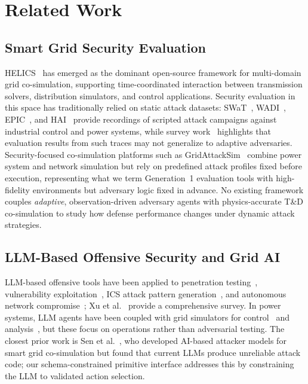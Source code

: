 \section{Related Work}
\label{sec:related}

\subsection{Smart Grid Security Evaluation}
\label{sec:related:eval}

HELICS~\cite{hardy2024helics} has emerged as the dominant open-source framework for multi-domain grid co-simulation, supporting time-coordinated interaction between transmission solvers, distribution simulators, and control applications.
Security evaluation in this space has traditionally relied on static attack datasets: SWaT~\cite{goh2017swat}, WADI~\cite{ahmed2017wadi}, EPIC~\cite{adepu2019epic}, and HAI~\cite{shin2020hai} provide recordings of scripted attack campaigns against industrial control and power systems, while survey work~\cite{sahani2023mlids} highlights that evaluation results from such traces may not generalize to adaptive adversaries.
Security-focused co-simulation platforms such as GridAttackSim~\cite{le2020gridattacksim} combine power system and network simulation but rely on predefined attack profiles fixed before execution, representing what we term Generation~1 evaluation tools with high-fidelity environments but adversary logic fixed in advance.
No existing framework couples \emph{adaptive}, observation-driven adversary agents with physics-accurate T\&D co-simulation to study how defense performance changes under dynamic attack strategies.

\subsection{LLM-Based Offensive Security and Grid AI}
\label{sec:related:llm}

LLM-based offensive tools have been applied to penetration testing~\cite{deng2024pentestgpt,xu2024autoattacker}, vulnerability exploitation~\cite{fang2024llmexploit}, ICS attack pattern generation~\cite{ahmed2025attackllm}, and autonomous network compromise~\cite{janjusevic2025mcp}; Xu et al.~\cite{xu2025forewarned} provide a comprehensive survey. In power systems, LLM agents have been coupled with grid simulators for control~\cite{zhang2025gridagent} and analysis~\cite{chen2025xgridagent}, but these focus on operations rather than adversarial testing. The closest prior work is Sen et al.~\cite{sen2024aiattacker}, who developed AI-based attacker models for smart grid co-simulation but found that current LLMs produce unreliable attack code; our schema-constrained primitive interface addresses this by constraining the LLM to validated action selection.

